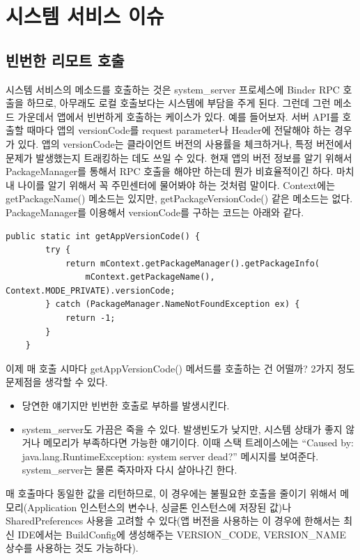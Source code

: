 \section{시스템 서비스 이슈}
\subsection{빈번한 리모트 호출}
시스템 서비스의 메소드를 호출하는 것은 system\_server 프로세스에 Binder RPC 호출을 하므로, 아무래도 로컬 호출보다는 시스템에 부담을 주게 된다.
그런데 그런 메소드 가운데서 앱에서 빈번하게 호출하는 케이스가 있다.
예를 들어보자. 서버 API를 호출할 때마다 앱의 versionCode를 request parameter나 Header에 전달해야 하는 경우가 있다.  앱의 versionCode는  클라이언트 버전의 사용률을 체크하거나, 특정 버전에서 문제가 발생했는지 트래킹하는 데도 쓰일 수 있다.
현재 앱의 버전 정보를 알기 위해서 PackageManager를 통해서 RPC 호출을 해야만 하는데 뭔가 비효율적이긴 하다. 
마치 내 나이를 알기 위해서 꼭 주민센터에 물어봐야 하는 것처럼 말이다. 
Context에는 getPackageName() 메소드는 있지만, getPackageVersionCode() 같은 메소드는 없다.\\

PackageManager를 이용해서 versionCode를 구하는 코드는 아래와 같다.
\begin{lstlisting}[frame=single]
	public static int getAppVersionCode() {
		try {
			return mContext.getPackageManager().getPackageInfo(
				mContext.getPackageName(), Context.MODE_PRIVATE).versionCode;
		} catch (PackageManager.NameNotFoundException ex) {
			return -1;
		}
	}
\end{lstlisting}

이제 매 호출 시마다 getAppVersionCode() 메서드를 호출하는 건 어떨까?
2가지 정도 문제점을 생각할 수 있다.
\begin{itemize}
\item 당연한 얘기지만 빈번한 호출로 부하를 발생시킨다.
\item system\_server도  가끔은 죽을 수 있다. 발생빈도가 낮지만, 시스템 상태가 좋지 않거나 메모리가 부족하다면 가능한 얘기이다. 이때 스택 트레이스에는 ``Caused by: java.lang.RuntimeException: system server dead?'' 메시지를 보여준다. system\_server는 물론 죽자마자 다시 살아나긴 한다.
\end{itemize}

매 호출마다 동일한 값을 리턴하므로, 이 경우에는 불필요한 호출을 줄이기 위해서 메모리(Application 인스턴스의 변수나, 싱글톤 인스턴스에 저장된 값)나 SharedPreferences 사용을 고려할 수 있다(앱 버전을 사용하는 이 경우에 한해서는 최신 IDE에서는 BuildConfig에 생성해주는 VERSION\_CODE, VERSION\_NAME 상수를 사용하는 것도 가능하다).\\


